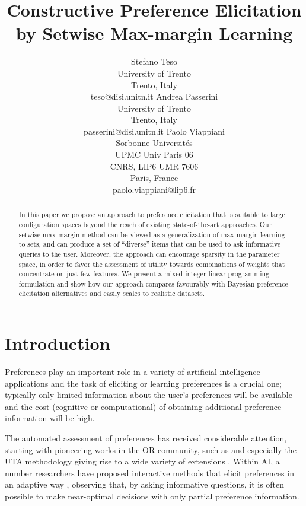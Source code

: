 \documentclass{article}
\title{Constructive Preference Elicitation by Setwise Max-margin Learning}
\author{Stefano Teso \\
University of Trento \\
Trento, Italy \\
teso@disi.unitn.it
\And
Andrea Passerini \\
University of Trento \\
Trento, Italy \\
passerini@disi.unitn.it
\And
Paolo Viappiani \\
Sorbonne Universit\'es\\
UPMC Univ Paris 06\\
CNRS, LIP6 UMR 7606\\
Paris, France \\
paolo.viappiani@lip6.fr}
\renewcommand\[{\begin{equation}}
\renewcommand\]{\end{equation}}
\begin{document}
\maketitle

\begin{abstract}
  In this paper we propose an approach to preference elicitation that
  is suitable to large configuration spaces beyond the reach of
  existing state-of-the-art approaches. Our setwise max-margin method
  can be viewed as a generalization of max-margin learning to sets,
  and can produce a set of ``diverse'' items that can be used to ask
  informative queries to the user.  Moreover, the approach can
  encourage sparsity in the parameter space, in order to favor the
  assessment of utility towards combinations of weights that
  concentrate on just few features.  We present a mixed integer linear
  programming formulation and show how our approach compares
  favourably with Bayesian preference elicitation alternatives and
  easily scales to realistic datasets.
\end{abstract}

\section{Introduction}
Preferences \cite{Peintner2008} play an important role in a variety of artificial
intelligence applications and the task of eliciting or learning preferences is a crucial one; 
typically only limited
information about the user's preferences will be available and the
cost (cognitive or computational) of obtaining additional preference information will be high.  

The automated assessment of preferences has received considerable attention,
starting with pioneering works in the OR community, such as \cite{White1984}
and especially the UTA methodology \cite{jaquetlsiskos1982} giving rise to a
wide variety of extensions \cite{jaquetlsiskos2001,greco2008ordinal}.
Within AI, a number researchers have proposed interactive methods that elicit
preferences in an adaptive way
\cite{chajewska2000,boutilier2002,Wang2003,boutilier2006,guo2010real,viappiani2010optimal},
observing that, by asking informative questions, it is often possible to make
near-optimal decisions with only partial preference information.
\end{document}
